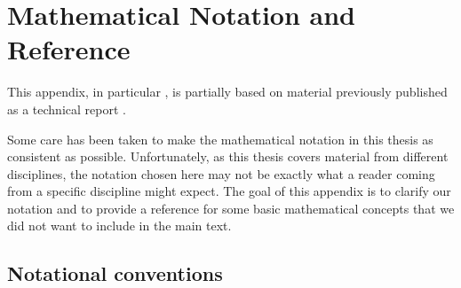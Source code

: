 \chapter{Mathematical Notation and Reference}
\label{app:mathematical_notation}

\begin{PriorPublication}
This appendix, in particular , is partially based on material previously published as a technical report \citep{stockel2021discrete}.
\end{PriorPublication}

Some care has been taken to make the mathematical notation in this thesis as consistent as possible.
Unfortunately, as this thesis covers material from different disciplines, the notation chosen here may not be exactly what a reader coming from a specific discipline might expect.
The goal of this appendix is to clarify our notation and to provide a reference for some basic mathematical concepts that we did not want to include in the main text.

\section{Notational conventions}

